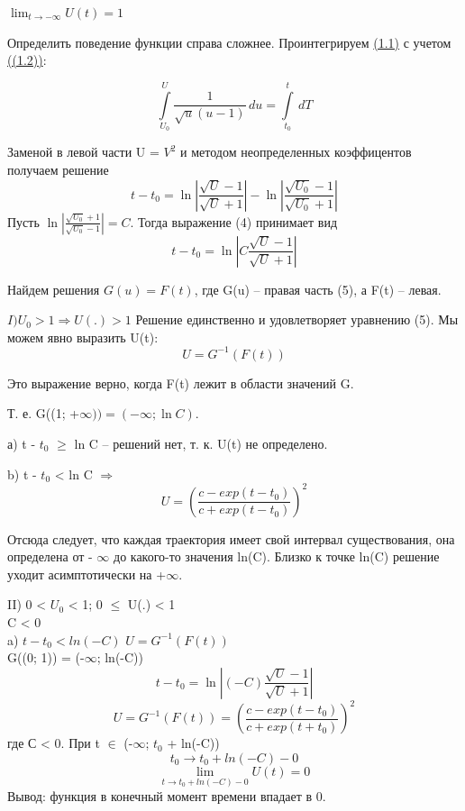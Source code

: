 \documentclass[10pt]{report}
\begin{document}
$\lim_{t \to -\infty } U(t) = 1$

Определить поведение функции справа сложнее. Проинтегрируем \hyperlink{1.1}{(1.1)} с учетом \hyperlink{1.2}{((1.2))}:

\[
\int\limits_{U_0}^U \frac 1 {\sqrt{u}(u-1)}\,du = \int\limits_{t_0}^t \,dT
\]

Заменой в левой части U = $V^2$ и методом неопределенных коэффицентов получаем решение
\begin{equation}
t  - t_0 = \ln\left|\frac {\sqrt{U} -1}  {\sqrt{U} +1}\right| - \ln\left|\frac {\sqrt{U_0} -1}  {\sqrt{U_0} +1}\right|
\end{equation}
Пусть $\ln\left|\frac {\sqrt{U_0} +1}  {\sqrt{U_0} -1}\right|=C$. Тогда выражение (4) принимает вид
\begin{equation}
t  - t_0 = \ln\left|C \frac {\sqrt{U} -1}  {\sqrt{U} +1}\right| 
\end{equation}

Найдем решения $G(u) = F(t)$, где G(u) -- правая часть (5), а  F(t) -- левая.

$I) U_0 > 1 \Rightarrow U(.) > 1$
Решение единственно и удовлетворяет уравнению (5). Мы можем явно выразить U(t):
\[
U = G^{-1}(F(t)) 
\] 

Это выражение верно, когда F(t) лежит в области значений G. \par
Т. е. G((1; +$\infty)) = (-\infty; \ln C).$
\par
а)  t - $t_0$ $\geq$ ln C -- решений нет, т. к. U(t) не определено. \par
b)  t - $t_0$ < ln C $\Rightarrow$
\[
U = \left( \frac {c-exp(t-t_0)} {c+exp(t-t_0)} \right)^2
\]

Отсюда следует, что каждая траектория имеет свой интервал существования, она определена от - $\infty$ до какого-то значения ln(C). Близко к точке  ln(C) решение уходит асимптотически на +$\infty$. 
\par
II) 0 < $U_0$ < 1; 0 $\leq$ U(.) < 1\\
C < 0\\
a) $t-t_0 < ln (-C)$
$U = G^{-1}(F(t)) $\\
G((0; 1)) = (-$\infty$; ln(-C))\\
\[
t  - t_0 = \ln\left|(-C) \frac {\sqrt{U} -1}  {\sqrt{U} +1}\right| 
\]
\[
U=G^{-1}(F(t)) = \left( \frac {c-exp(t-t_0)} {c+exp(t+t_0)} \right)^2
\]
где С < 0. При t $\in$ (-$\infty$; $t_0$ + ln(-C))
\[
t_0 \rightarrow t_0 +ln(-C) - 0
\]
\[
\lim_{t \to {t_0+ln(-C)-0} } U(t) = 0
\]
Вывод: функция в конечный момент времени впадает в 0.
\end{document}
